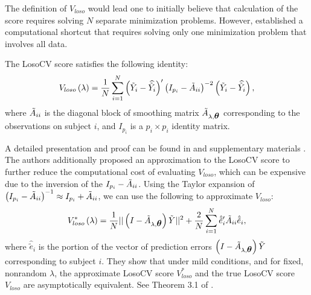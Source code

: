 \bigskip

The definition of $V_{loso}$ would lead one to initially believe that calculation of the score requires solving $N$ separate minimization problems. However, \cite{xu2012asymptotic} established a computational shortcut that requires solving only one minimization problem that involves all data. 
  
  \begin{lemma} \label{lemma:losocv-shortcut}
  The LosoCV score satisfies the following identity:
  \begin{equation*}
 V_{loso}\left( \lambda \right) = \frac{1}{N} \sum_{i = 1}^N \left(\tilde{Y}_i - \widehat{\tilde{Y}_i}\right)' \left(I_{p_i} - \tilde{A}_{ii}\right)^{-2}\left(\tilde{Y}_i - \widehat{\tilde{Y}_i}\right),
  \end{equation*}
  \noindent
  where $\tilde{A}_{ii}$ is the diagonal block of smoothing matrix $\tilde{A}_{\lambda,\mbox{\boldmath $\theta$}}$ corresponding to the observations on subject $i$, and $I_{p_i}$ is a $p_i \times p_i$ identity matrix.
\end{lemma}

A detailed presentation and proof can be found in \cite{xu2012asymptotic} and supplementary materials \cite{xuasymptotic}.  The authors additionally proposed an approximation to the LosoCV score to further reduce the computational cost of evaluating $V_{loso}$, which can be expensive due to the inversion of the $I_{p_i} - \tilde{A}_{ii}$. Using the Taylor expansion of $\left(I_{p_i} - \tilde{A}_{ii}\right)^{-1} \approx I_{p_i} + \tilde{A}_{ii}$, we can use the following to approximate $V_{loso}$:
\begin{equation} \label{eq:approx-losocv}
V_{loso}^*\left( \lambda \right) = \frac{1}{N} \vert \vert \left(I - \tilde{A}_{\lambda,\mbox{\boldmath $\theta$}}\right)\tilde{Y} \vert \vert^2 + \frac{2}{N} \sum_{i = 1}^N \hat{\tilde{e}}'_{i}\tilde{A}_{ii}\hat{\tilde{e}}_i,
\end{equation}
\noindent
where $\hat{\tilde{e}}_i$ is the portion of the vector of prediction errors $\left(I - \tilde{A}_{\lambda,\mbox{\boldmath $\theta$}}\right)\tilde{Y}$ corresponding to subject $i$. They show that under mild conditions, and for fixed, nonrandom $\lambda$, the approximate LosoCV score $V_{loso}^*$ and the true LosoCV score $V_{loso}$ are asymptotically equivalent. See Theorem 3.1 of \cite{xu2012asymptotic}.
  

